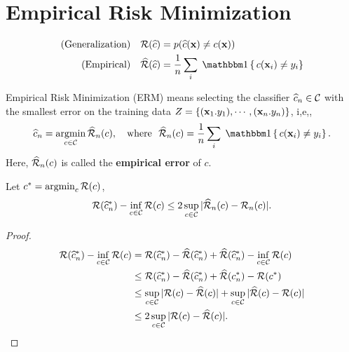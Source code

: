 \section{Empirical Risk Minimization}
\begin{definition}
	\begin{align}
		(\text{Generalization}) \quad & \cR(\widehat{c}) = p(\widehat{c}(\bfx) \neq c(\bfx)) \\
		(\text{Empirical}) \quad & \widehat{\cR}(\widehat{c}) = \frac{1}{n} \sum_i \Ind{c(\bfx_i) \neq y_i}
	\end{align}
\end{definition}
\begin{definition}[ERM]
 Empirical Risk Minimization (ERM) means selecting the classifier $\widehat{c}_n \in \mathcal{C} $ with the smallest error on the training data $Z = \{(\mathbf{x}_1. y_1), \cdots, (\mathbf{x}_n. y_n) \}$, i,e,,
 $$
 \widehat{c}_n = \argmin_{c \in \cC} \widehat{\cR}_n(c), \where \widehat{\cR}_n(c) = \frac{1}{n} \sum_i \Ind{c(\bfx_i) \neq y_i}.
 $$
 Here, $\widehat{\mathcal{R}}_n(c)$ is called the \textbf{empirical error} of $c$.
\end{definition}


\begin{theorem} Let $c^* = \operatorname*{argmin}_c \mathcal{R}(c)$,
$$
\mathcal{R}(\widehat{c}^*_n) - \inf_{c \in \mathcal{C}} \mathcal{R}(c) \leq 2 \sup_{c \in \mathcal{C}} |\widehat{\mathcal{R}}_n(c) - \mathcal{R}_n(c) |.
$$
\end{theorem}
\begin{proof}
	\begin{align}
		\mathcal{R}(\widehat{c}^*_n) - \inf_{c \in \mathcal{C}} \mathcal{R}(c) & = \mathcal{R}(\widehat{c}^*_n) - \widehat{\mathcal{R}}(\widehat{c}^*_n) + \widehat{\mathcal{R}}(\widehat{c}^*_n) - \inf_{c \in \mathcal{C}} \mathcal{R}(c)\\
		& \leq \mathcal{R}(\widehat{c}^*_n) - \widehat{\mathcal{R}}(\widehat{c}^*_n) + \widehat{\mathcal{R}}({c}^*_n) - \mathcal{R}({c}^*) \\
		& \leq \sup_{c \in \mathcal{C}} | \mathcal{R}(c) - \widehat{\mathcal{R}}(c) | + \sup_{c \in \mathcal{C}} | \widehat{\mathcal{R}}(c) - \mathcal{R}(c)| \\
		& \leq 2 \sup_{c \in \mathcal{C}} | \mathcal{R}(c) - \widehat{\mathcal{R}}(c) |.
	\end{align}
\end{proof}

